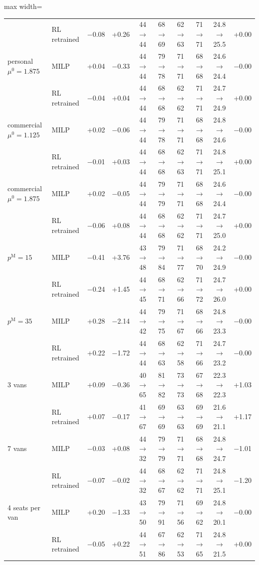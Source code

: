 \begin{table}[H]
\begin{adjustbox}{max width=\textwidth}
\begin{tabular}{llrrcccccr}
 & RL retrained & $-$0.08 & +0.26 & 44$\to$44 & 68$\to$69 & 62$\to$63 & 71$\to$71 & 24.8$\to$25.5 & +0.00 \\
personal $\mu^{0}=1.875$ & MILP & +0.04 & $-$0.33 & 44$\to$44 & 79$\to$78 & 71$\to$71 & 68$\to$68 & 24.6$\to$24.4 & $-$0.00 \\
 & RL retrained & $-$0.04 & +0.04 & 44$\to$44 & 68$\to$68 & 62$\to$62 & 71$\to$71 & 24.7$\to$24.9 & +0.00 \\
commercial $\mu^{0}=1.125$ & MILP & +0.02 & $-$0.06 & 44$\to$44 & 79$\to$78 & 71$\to$71 & 68$\to$68 & 24.8$\to$24.6 & $-$0.00 \\
 & RL retrained & $-$0.01 & +0.03 & 44$\to$44 & 68$\to$68 & 62$\to$63 & 71$\to$71 & 24.8$\to$25.1 & +0.00 \\
commercial $\mu^{0}=1.875$ & MILP & +0.02 & $-$0.05 & 44$\to$44 & 79$\to$79 & 71$\to$71 & 68$\to$68 & 24.6$\to$24.4 & $-$0.00 \\
 & RL retrained & $-$0.06 & +0.08 & 44$\to$44 & 68$\to$68 & 62$\to$62 & 71$\to$71 & 24.7$\to$25.0 & +0.00 \\
$p^{\mathrm M}=15$ & MILP & $-$0.41 & +3.76 & 43$\to$48 & 79$\to$84 & 71$\to$77 & 68$\to$70 & 24.2$\to$24.9 & $-$0.00 \\
 & RL retrained & $-$0.24 & +1.45 & 44$\to$45 & 68$\to$71 & 62$\to$66 & 71$\to$72 & 24.7$\to$26.0 & +0.00 \\
$p^{\mathrm M}=35$ & MILP & +0.28 & $-$2.14 & 44$\to$42 & 79$\to$75 & 71$\to$67 & 68$\to$66 & 24.8$\to$23.3 & $-$0.00 \\
 & RL retrained & +0.22 & $-$1.72 & 44$\to$44 & 68$\to$63 & 62$\to$58 & 71$\to$66 & 24.7$\to$23.2 & $-$0.00 \\
3 vans & MILP & +0.09 & $-$0.36 & 40$\to$65 & 81$\to$82 & 73$\to$73 & 67$\to$68 & 22.3$\to$22.3 & +1.03 \\
 & RL retrained & +0.07 & $-$0.17 & 41$\to$67 & 69$\to$69 & 63$\to$63 & 69$\to$69 & 21.6$\to$21.1 & +1.17 \\
7 vans & MILP & $-$0.03 & +0.08 & 44$\to$32 & 79$\to$79 & 71$\to$71 & 68$\to$68 & 24.8$\to$24.7 & $-$1.01 \\
 & RL retrained & $-$0.07 & $-$0.02 & 44$\to$32 & 68$\to$67 & 62$\to$62 & 71$\to$71 & 24.8$\to$25.1 & $-$1.20 \\
4 seats per van & MILP & +0.20 & $-$1.33 & 43$\to$50 & 79$\to$91 & 71$\to$56 & 69$\to$62 & 24.8$\to$20.1 & $-$0.00 \\
 & RL retrained & $-$0.05 & +0.22 & 44$\to$51 & 67$\to$86 & 62$\to$53 & 71$\to$65 & 24.8$\to$21.5 & +0.00 \\

\end{tabular}
\end{adjustbox}
\end{table}
